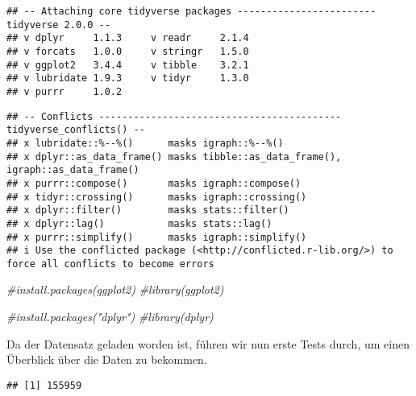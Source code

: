 \documentclass[
]{article}
\newenvironment{Shaded}{\begin{snugshade}}{\end{snugshade}}
\newcommand{\CommentTok}[1]{\textcolor[rgb]{0.56,0.35,0.01}{\textit{#1}}}
\newcommand{\FunctionTok}[1]{\textcolor[rgb]{0.13,0.29,0.53}{\textbf{#1}}}
\newcommand{\NormalTok}[1]{#1}
\newcommand{\SpecialCharTok}[1]{\textcolor[rgb]{0.81,0.36,0.00}{\textbf{#1}}}
\begin{document}
\begin{verbatim}
## -- Attaching core tidyverse packages ------------------------ tidyverse 2.0.0 --
## v dplyr     1.1.3     v readr     2.1.4
## v forcats   1.0.0     v stringr   1.5.0
## v ggplot2   3.4.4     v tibble    3.2.1
## v lubridate 1.9.3     v tidyr     1.3.0
## v purrr     1.0.2
\end{verbatim}

\begin{verbatim}
## -- Conflicts ------------------------------------------ tidyverse_conflicts() --
## x lubridate::%--%()      masks igraph::%--%()
## x dplyr::as_data_frame() masks tibble::as_data_frame(), igraph::as_data_frame()
## x purrr::compose()       masks igraph::compose()
## x tidyr::crossing()      masks igraph::crossing()
## x dplyr::filter()        masks stats::filter()
## x dplyr::lag()           masks stats::lag()
## x purrr::simplify()      masks igraph::simplify()
## i Use the conflicted package (<http://conflicted.r-lib.org/>) to force all conflicts to become errors
\end{verbatim}

\begin{Shaded}
\begin{Highlighting}[]
\CommentTok{\#install.packages(ggplot2)}
\CommentTok{\#library(ggplot2)}

\CommentTok{\#install.packages("dplyr")}
\CommentTok{\#library(dplyr)}
\end{Highlighting}
\end{Shaded}

Da der Datensatz geladen worden ist, führen wir nun erste Tests durch,
um einen Überblick über die Daten zu bekommen.

\begin{Shaded}
\end{Shaded}

\begin{verbatim}
## [1] 155959
\end{verbatim}

\begin{Shaded}
\end{Shaded}
\end{document}
